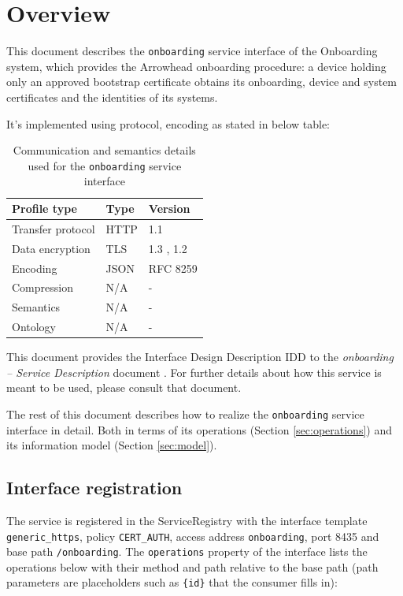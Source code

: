 \documentclass[a4paper]{arrowhead}
\begin{document}
\section{Overview}
\label{sec:overview}

This document describes the \texttt{onboarding} service interface of the Onboarding system, which provides the Arrowhead onboarding procedure: a device holding only an approved bootstrap certificate obtains its onboarding, device and system certificates and the identities of its systems.

It's implemented using protocol, encoding as stated in below table:
\begin{table}[ht!]
  \centering
  \begin{tabular}{|l|l|l|}
    \hline
    \rowcolor{gray!33} Profile type & Type & Version \\ \hline
    Transfer protocol & HTTP & 1.1 \cite{rfc9112} \\ \hline
    Data encryption & TLS & 1.3 \cite{rfc8446}, 1.2 \cite{rfc5246} \\ \hline
    Encoding & JSON & RFC 8259 \cite{rfc8259} \\ \hline
    Compression & N/A & - \\ \hline
    Semantics & N/A & - \\ \hline
    Ontology & N/A & - \\ \hline
  \end{tabular}
  \caption{Communication and semantics details used for the \texttt{onboarding} service interface}
  \label{tab:comunication_semantics_profile}
\end{table}

This document provides the Interface Design Description IDD to the \textit{onboarding -- Service Description} document \cite{onb-onboarding-sd}.
For further details about how this service is meant to be used, please consult that document.

The rest of this document describes how to realize the \texttt{onboarding} service
interface in detail. Both in terms of its operations (Section \ref{sec:operations}) and its information model (Section \ref{sec:model}).

\subsection{Interface registration}

The service is registered in the ServiceRegistry with the interface template \texttt{generic\_\allowbreak{}https}, policy \texttt{CERT\_\allowbreak{}AUTH}, access address \texttt{onboarding}, port 8435 and base path \texttt{/\allowbreak{}onboarding}. The \texttt{operations} property of the interface lists the operations below with their method and path relative to the base path (path parameters are placeholders such as \texttt{\{id\}} that the consumer fills in):
\end{document}
